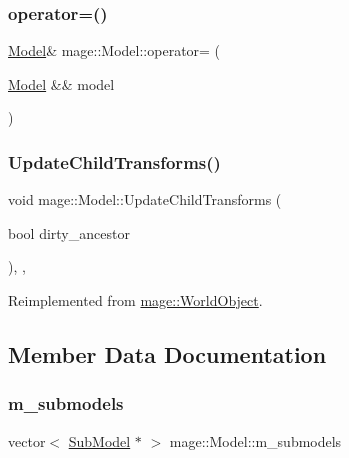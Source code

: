 \hypertarget{classmage_1_1_model_a084e30d15822bfefa79128f30a57cc02}{}\label{classmage_1_1_model_a084e30d15822bfefa79128f30a57cc02} 
\subsubsection{\texorpdfstring{operator=()}{operator=()}\hspace{0.1cm}{\footnotesize\ttfamily [2/2]}}
{\footnotesize\ttfamily \hyperlink{classmage_1_1_model}{Model}\& mage\+::\+Model\+::operator= (\begin{DoxyParamCaption}\item[{\hyperlink{classmage_1_1_model}{Model} \&\&}]{model }\end{DoxyParamCaption})\hspace{0.3cm}{\ttfamily [delete]}}

\hypertarget{classmage_1_1_model_a2f3c812220367093bdca125e6b6e898a}{}\label{classmage_1_1_model_a2f3c812220367093bdca125e6b6e898a} 
\subsubsection{\texorpdfstring{Update\+Child\+Transforms()}{UpdateChildTransforms()}}
{\footnotesize\ttfamily void mage\+::\+Model\+::\+Update\+Child\+Transforms (\begin{DoxyParamCaption}\item[{bool}]{dirty\+\_\+ancestor }\end{DoxyParamCaption})\hspace{0.3cm}{\ttfamily [override]}, {\ttfamily [protected]}, {\ttfamily [virtual]}}



Reimplemented from \hyperlink{classmage_1_1_world_object_ab384751f7c14c931e8606f927825b6c8}{mage\+::\+World\+Object}.



\subsection{Member Data Documentation}
\hypertarget{classmage_1_1_model_ab62e74450091e144b7b62d6570ec7af7}{}\label{classmage_1_1_model_ab62e74450091e144b7b62d6570ec7af7} 
\subsubsection{\texorpdfstring{m\+\_\+submodels}{m\_submodels}}
{\footnotesize\ttfamily vector$<$ \hyperlink{classmage_1_1_sub_model}{Sub\+Model} $\ast$ $>$ mage\+::\+Model\+::m\+\_\+submodels\hspace{0.3cm}{\ttfamily [private]}}

